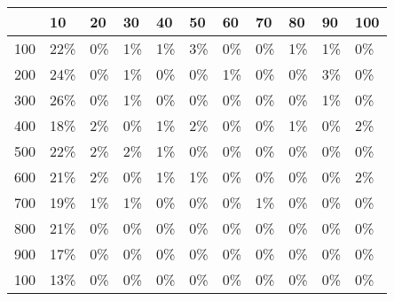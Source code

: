\documentclass{article}
\begin{document}
\begin{center}
\begin{table}
\begin{tabularx}{0.8\textwidth}{|X|X|X|X|X|X|X|X|X|X|X|}
\hline &10&20&30&40&50&60&70&80&90&100\\
\hline 100&22\%&0\%&1\%&1\%&3\%&0\%&0\%&1\%&1\%&0\%\\
\hline 200&24\%&0\%&1\%&0\%&0\%&1\%&0\%&0\%&3\%&0\%\\
\hline 300&26\%&0\%&1\%&0\%&0\%&0\%&0\%&0\%&1\%&0\%\\
\hline 400&18\%&2\%&0\%&1\%&2\%&0\%&0\%&1\%&0\%&2\%\\
\hline 500&22\%&2\%&2\%&1\%&0\%&0\%&0\%&0\%&0\%&0\%\\
\hline 600&21\%&2\%&0\%&1\%&1\%&0\%&0\%&0\%&0\%&2\%\\
\hline 700&19\%&1\%&1\%&0\%&0\%&0\%&1\%&0\%&0\%&0\%\\
\hline 800&21\%&0\%&0\%&0\%&0\%&0\%&0\%&0\%&0\%&0\%\\
\hline 900&17\%&0\%&0\%&0\%&0\%&0\%&0\%&0\%&0\%&0\%\\
\hline 100&13\%&0\%&0\%&0\%&0\%&0\%&0\%&0\%&0\%&0\%\\
\hline
\end{tabularx}
\end{table}
\end{center}
\end{document}
